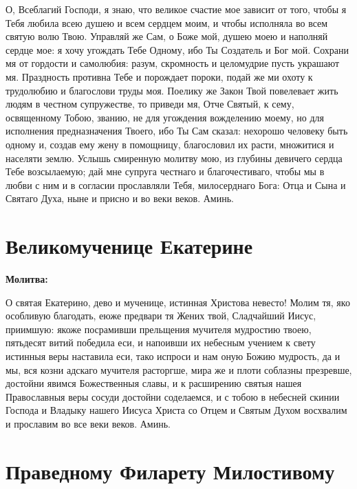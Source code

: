 
О, Всеблагий Господи, я знаю, что великое счастие мое зависит от того, чтобы я Тебя любила всею душею и всем сердцем моим, и чтобы исполняла во всем святую волю Твою. Управляй же Сам, о Боже мой, душею моею и наполняй сердце мое: я хочу угождать Тебе Одному, ибо Ты Создатель и Бог мой. Сохрани мя от гордости и самолюбия: разум, скромность и целомудрие пусть украшают мя. Праздность противна Тебе и порождает пороки, подай же ми охоту к трудолюбию и благослови труды моя. Поелику же Закон Твой повелевает жить людям в честном супружестве, то приведи мя, Отче Святый, к сему, освященному Тобою, званию, не для угождения вожделению моему, но для исполнения предназначения Твоего, ибо Ты Сам сказал: нехорошо человеку быть одному и, создав ему жену в помощницу, благословил их расти, множитися и населяти землю. Услышь смиренную молитву мою, из глубины девичего сердца Тебе возсылаемую; дай мне супруга честнаго и благочестиваго, чтобы мы в любви с ним и в согласии прославляли Тебя, милосерднаго Бога: Отца и Сына и Святаго Духа, ныне и присно и во веки веков. Аминь.


\section{Великомученице Екатерине}
 
\bfseries Молитва:\normalfont{}


О святая Екатерино, дево и мученице, истинная Христова невесто! Молим тя, яко особливую благодать, еюже предвари тя Жених твой, Сладчайший Иисус, приимшую: якоже посрамивши прельщения мучителя мудростию твоею, пятьдесят витий победила еси, и напоивши их небесным учением к свету истинныя веры наставила еси, тако испроси и нам оную Божию мудрость, да и мы, вся козни адскаго мучителя расторгше, мира же и плоти соблазны презревше, достойни явимся Божественныя славы, и к расширению святыя нашея Православныя веры сосуди достойни соделаемся, и с тобою в небесней скинии Господа и Владыку нашего Иисуса Христа со Отцем и Святым Духом восхвалим и прославим во все веки веков. Аминь.

 





\section{Праведному Филарету Милостивому}
 
